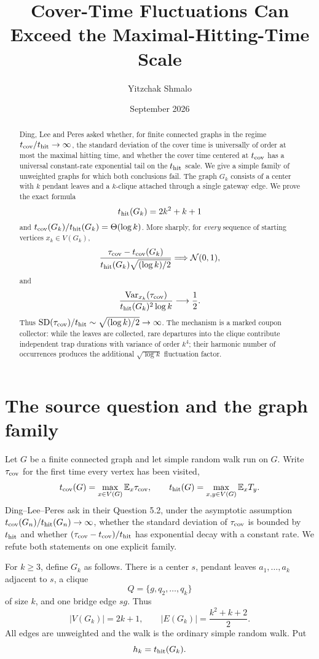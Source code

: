\documentclass[11pt]{article}
\title{Cover-Time Fluctuations Can Exceed the Maximal-Hitting-Time Scale}
\author{Yitzchak Shmalo}
\date{September 2026}
\newcommand{\E}{\mathbb E}
\newcommand{\Var}{\operatorname{Var}}
\newcommand{\N}{\mathcal N}
\begin{document}
\maketitle

\begin{abstract}
Ding, Lee and Peres asked whether, for finite connected graphs in the regime
$t_{\rm cov}/t_{\rm hit}\to\infty$, the standard deviation of the cover time is
universally of order at most the maximal hitting time, and whether the cover
time centered at $t_{\rm cov}$ has a universal constant-rate exponential tail
on the $t_{\rm hit}$ scale.  We give a simple family of unweighted graphs for
which both conclusions fail.  The graph $G_k$ consists of a center with $k$
pendant leaves and a $k$-clique attached through a single gateway edge.  We
prove the exact formula
\[
 t_{\rm hit}(G_k)=2k^2+k+1
\]
and $t_{\rm cov}(G_k)/t_{\rm hit}(G_k)=\Theta(\log k)$.  More sharply, for
\emph{every} sequence of starting vertices $x_k\in V(G_k)$,
\[
 \frac{\tau_{\rm cov}-t_{\rm cov}(G_k)}
 {t_{\rm hit}(G_k)\sqrt{(\log k)/2}}
 \Longrightarrow \N(0,1),
\]
and
\[
 \frac{\Var_{x_k}(\tau_{\rm cov})}
 {t_{\rm hit}(G_k)^2\log k}\longrightarrow \frac12.
\]
Thus $\operatorname{SD}(\tau_{\rm cov})/t_{\rm hit}\sim
\sqrt{(\log k)/2}\to\infty$.  The mechanism is a marked coupon collector:
while the leaves are collected, rare departures into the clique contribute
independent trap durations with variance of order $k^4$; their harmonic number
of occurrences produces the additional $\sqrt{\log k}$ fluctuation factor.
\end{abstract}

\section{The source question and the graph family}

Let $G$ be a finite connected graph and let simple random walk run on $G$.
Write $\tau_{\rm cov}$ for the first time every vertex has been visited,
\[
 t_{\rm cov}(G)=\max_{x\in V(G)}\E_x\tau_{\rm cov},
 \qquad
 t_{\rm hit}(G)=\max_{x,y\in V(G)}\E_xT_y.
\]
Ding--Lee--Peres \cite{DLP} ask in their Question 5.2, under the asymptotic
assumption $t_{\rm cov}(G_n)/t_{\rm hit}(G_n)\to\infty$, whether the standard
deviation of $\tau_{\rm cov}$ is bounded by $t_{\rm hit}$ and whether
$(\tau_{\rm cov}-t_{\rm cov})/t_{\rm hit}$ has exponential decay with a
constant rate.  We refute both statements on one explicit family.

For $k\ge3$, define $G_k$ as follows.  There is a center $s$, pendant leaves
$a_1,\dots,a_k$ adjacent to $s$, a clique
\[
 Q=\{g,q_2,\dots,q_k\}
\]
of size $k$, and one bridge edge $s g$.  Thus
\[
 |V(G_k)|=2k+1,
 \qquad
 |E(G_k)|=\frac{k^2+k+2}{2}.
\]
All edges are unweighted and the walk is the ordinary simple random walk.
Put
\[
 h_k=t_{\rm hit}(G_k).
\]
\end{document}
